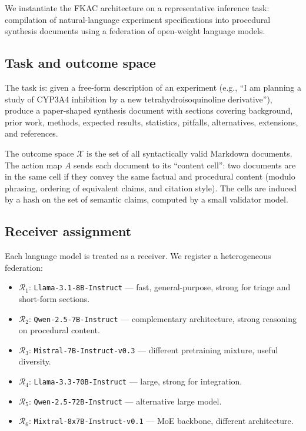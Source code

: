 \documentclass[11pt,twocolumn,a4paper]{article}
\theoremstyle{definition}
\theoremstyle{remark}
\newcommand{\Cands}{\mathcal{X}}
\newcommand{\receiver}{\mathcal{R}}
\begin{document}
We instantiate the FKAC architecture on a representative inference task: compilation of natural-language experiment specifications into procedural synthesis documents using a federation of open-weight language models.

\subsection{Task and outcome space}

The task is: given a free-form description of an experiment (e.g., ``I am planning a study of CYP3A4 inhibition by a new tetrahydroisoquinoline derivative''), produce a paper-shaped synthesis document with sections covering background, prior work, methods, expected results, statistics, pitfalls, alternatives, extensions, and references.

The outcome space $\Cands$ is the set of all syntactically valid Markdown documents. The action map $A$ sends each document to its ``content cell'': two documents are in the same cell if they convey the same factual and procedural content (modulo phrasing, ordering of equivalent claims, and citation style). The cells are induced by a hash on the set of semantic claims, computed by a small validator model.

\subsection{Receiver assignment}

Each language model is treated as a receiver. We register a heterogeneous federation:

\begin{itemize}[leftmargin=*,nosep]
\item $\receiver_1$: \texttt{Llama-3.1-8B-Instruct} --- fast, general-purpose, strong for triage and short-form sections.
\item $\receiver_2$: \texttt{Qwen-2.5-7B-Instruct} --- complementary architecture, strong reasoning on procedural content.
\item $\receiver_3$: \texttt{Mistral-7B-Instruct-v0.3} --- different pretraining mixture, useful diversity.
\item $\receiver_4$: \texttt{Llama-3.3-70B-Instruct} --- large, strong for integration.
\item $\receiver_5$: \texttt{Qwen-2.5-72B-Instruct} --- alternative large model.
\item $\receiver_6$: \texttt{Mixtral-8x7B-Instruct-v0.1} --- MoE backbone, different architecture.
\end{itemize}
\end{document}
